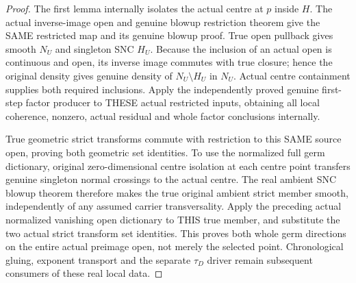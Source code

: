 \begin{proof}
The first lemma internally isolates the actual centre at $p$ inside $H$.
The actual inverse-image open and genuine blowup restriction theorem give
the SAME restricted map and its genuine blowup proof. True open pullback
gives smooth $N_U$ and singleton SNC $H_U$. Because the inclusion of an
actual open is continuous and open, its inverse image commutes with true
closure; hence the original density gives genuine density of
$N_U\setminus H_U$ in $N_U$. Actual centre containment supplies both
required inclusions. Apply the independently proved genuine first-step
factor producer to THESE actual restricted inputs, obtaining all local
coherence, nonzero, actual residual and whole factor conclusions internally.

True geometric strict transforms commute with restriction to this SAME
source open, proving both geometric set identities. To use the normalized
full germ dictionary, original zero-dimensional centre isolation at each
centre point transfers genuine singleton normal crossings to the actual
centre. The real ambient SNC blowup theorem therefore makes the true
original ambient strict member smooth, independently of any assumed
carrier transversality. Apply the preceding actual normalized vanishing
open dictionary to THIS true member, and substitute the two actual strict
transform set identities. This proves both whole germ directions on the
entire actual preimage open, not merely the selected point. Chronological
gluing, exponent transport and the separate $\tau_D$ driver remain subsequent
consumers of these real local data.
\end{proof}

